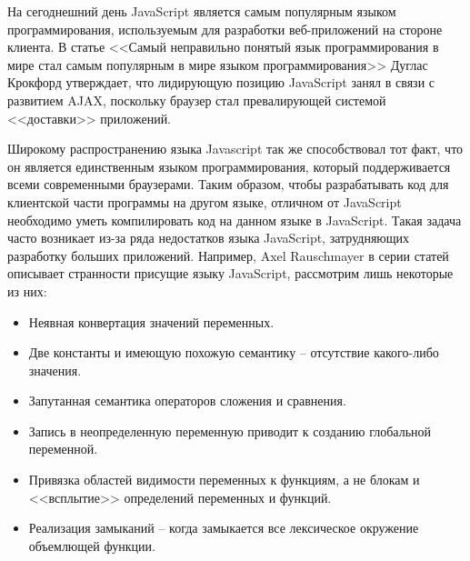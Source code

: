 \startprefacepage


На сегоднешний день JavaScript является самым популярным языком программирования, используемым для разработки веб-приложений на стороне клиента\cite{JsUsage, LangUsage}. В статье <<Самый неправильно понятый язык программирования в мире стал самым популярным в мире языком программирования>>\cite{MostPopLang} Дуглас Крокфорд утверждает, что лидирующую позицию JavaScript занял в связи с развитием AJAX\cite{AJAX}, поскольку браузер стал превалирующей системой <<доставки>> приложений. %

Широкому распространению языка Javascript так же способствовал тот факт, что он является единственным языком программирования, который поддерживается всеми современными браузерами. Таким образом, чтобы разрабатывать код для клиентской части программы на другом языке, отличном от JavaScript необходимо уметь компилировать код на данном языке  в JavaScript. Такая задача часто возникает из-за ряда недостатков языка JavaScript, затрудняющих разработку больших приложений.
Например, Axel Rauschmayer в серии статей описывает странности присущие языку JavaScript\cite{JsQuirks}, рассмотрим лишь некоторые из них:
\begin{itemize}
\item Неявная конвертация значений переменных.
\item Две константы  и  имеющую похожую семантику -- отсутствие какого-либо значения. 
\item Запутанная семантика операторов сложения и сравнения.
\item Запись в неопределенную переменную приводит к созданию глобальной переменной.
\item Привязка областей видимости переменных к функциям, а не блокам и <<всплытие>> определений переменных и функций.
\item Реализация замыканий -- когда замыкается все лексическое окружение объемлющей функции.
\end{itemize}
%

